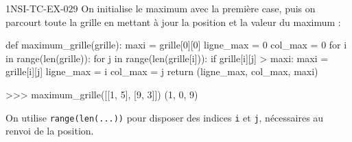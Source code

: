 \begin{corrige}{1NSI-TC-EX-029}
On initialise le maximum avec la première case, puis on parcourt toute la grille en mettant à jour la position et la valeur du maximum :

\begin{python}
def maximum_grille(grille):
    maxi = grille[0][0]
    ligne_max = 0
    col_max = 0
    for i in range(len(grille)):
        for j in range(len(grille[i])):
            if grille[i][j] > maxi:
                maxi = grille[i][j]
                ligne_max = i
                col_max = j
    return (ligne_max, col_max, maxi)
\end{python}

\begin{console}
>>> maximum_grille([[1, 5], [9, 3]])
(1, 0, 9)
\end{console}

On utilise \lstinline{range(len(...))} pour disposer des indices \lstinline{i} et \lstinline{j}, nécessaires au renvoi de la position.
\end{corrige}
